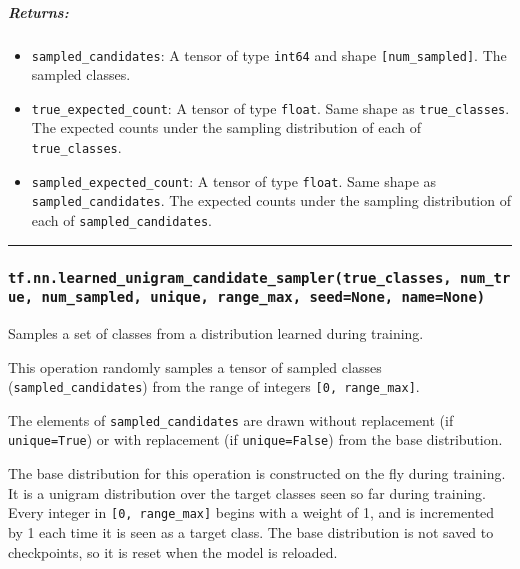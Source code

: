 \subparagraph{Returns: }\label{returns-26}

\begin{itemize}
\tightlist
\item
  \texttt{sampled\_candidates}: A tensor of type \texttt{int64} and
  shape \texttt{{[}num\_sampled{]}}. The sampled classes.
\item
  \texttt{true\_expected\_count}: A tensor of type \texttt{float}. Same
  shape as \texttt{true\_classes}. The expected counts under the
  sampling distribution of each of \texttt{true\_classes}.
\item
  \texttt{sampled\_expected\_count}: A tensor of type \texttt{float}.
  Same shape as \texttt{sampled\_candidates}. The expected counts under
  the sampling distribution of each of \texttt{sampled\_candidates}.
\end{itemize}

\begin{center}\rule{0.5\linewidth}{\linethickness}\end{center}

\subsubsection{\texorpdfstring{\texttt{tf.nn.learned\_unigram\_candidate\_sampler(true\_classes,\ num\_true,\ num\_sampled,\ unique,\ range\_max,\ seed=None,\ name=None)}
}{tf.nn.learned\_unigram\_candidate\_sampler(true\_classes, num\_true, num\_sampled, unique, range\_max, seed=None, name=None) }}\label{tf.nn.learnedux5funigramux5fcandidateux5fsamplertrueux5fclasses-numux5ftrue-numux5fsampled-unique-rangeux5fmax-seednone-namenone}

Samples a set of classes from a distribution learned during training.

This operation randomly samples a tensor of sampled classes
(\texttt{sampled\_candidates}) from the range of integers
\texttt{{[}0,\ range\_max{]}}.

The elements of \texttt{sampled\_candidates} are drawn without
replacement (if \texttt{unique=True}) or with replacement (if
\texttt{unique=False}) from the base distribution.

The base distribution for this operation is constructed on the fly
during training. It is a unigram distribution over the target classes
seen so far during training. Every integer in
\texttt{{[}0,\ range\_max{]}} begins with a weight of 1, and is
incremented by 1 each time it is seen as a target class. The base
distribution is not saved to checkpoints, so it is reset when the model
is reloaded.

